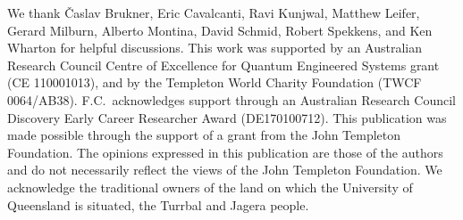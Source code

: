 \documentclass[a4paper,onecolumn,11pt,accepted=2018-05-04]{quantumarticle}
\begin{document}

\vspace{-2pt}
\begin{acknowledgments}
\vspace{-2pt}

We thank {\v C}aslav Brukner, Eric Cavalcanti, Ravi Kunjwal, Matthew Leifer, Gerard Milburn, Alberto Montina, David Schmid, Robert Spekkens, and Ken Wharton for helpful discussions. This work was supported by an Australian Research Council Centre of Excellence for Quantum Engineered Systems grant (CE 110001013), and by the Templeton World Charity Foundation (TWCF 0064/AB38). F.C.\ acknowledges support through an Australian Research Council Discovery Early Career Researcher Award (DE170100712). This publication  was made possible through the support of a grant from the John Templeton Foundation. The opinions expressed in this publication are those of the authors and do not necessarily reflect the views of the John Templeton Foundation. We acknowledge the traditional owners of the land on which the University of Queensland is situated, the Turrbal and Jagera people.
\end{acknowledgments}



%
%
\end{document}
